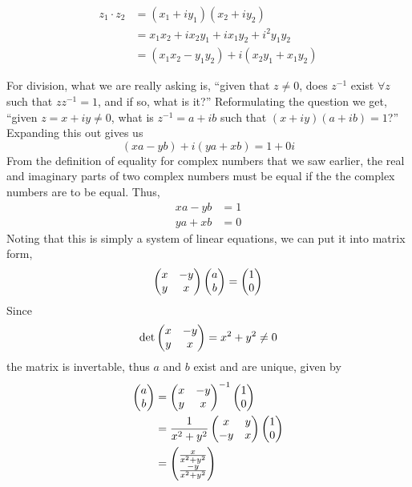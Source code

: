 \documentclass[10pt]{scrartcl}
\numberwithin{equation}{subsection}
\theoremstyle{definition}
\theoremstyle{remark}
\newcommand{\inv}[1]{
	{#1}^{-1}
}
\begin{document}
\begin{align*}
z_1 \cdot z_2 &= (x_1 + i y_1)(x_2+ i y_2)\\
&= x_1 x_2 + i x_2 y_1 + i x_1 y_2 + i^2 y_1 y_2\\
&= (x_1 x_2 - y_1 y_2) + i(x_2 y_1 + x_1 y_2)
\end{align*}

For division, what we are really asking is, 
``given that $z \neq 0$, does $\inv{z}$ exist $\forall z$ such that $z \inv{z} = 1$, and if so, what is it?'' 
Reformulating the question we get,
``given $z = x + iy \neq 0$, what is $\inv{z} = a + ib$ such that $(x+iy)(a+ib) = 1$?''
Expanding this out gives us
\[
(xa - yb) + i(ya + xb) = 1 + 0i
\]
From the definition of equality for complex numbers that we saw earlier,
the real and imaginary parts of two complex numbers must be equal if the the
complex numbers are to be equal. Thus,
\begin{align*}
xa - yb &= 1 \\
ya + xb &= 0
\end{align*}
Noting that this is simply a system of linear equations, we can put it into
matrix form,
\[
\pmqty{x & -y \\ y & x} \pmqty{a \\ b} = \pmqty{1 \\ 0}
\]
Since 
\[
\det \pmqty{x & -y \\ y & x}  = x^2 + y^2 \neq 0
\]
the matrix is invertable, thus $a$ and $b$ exist and are unique, given by
\begin{align*}
\pmqty{a \\ b} &= \inv{\pmqty{x & -y \\ y & x}} \pmqty{1 \\ 0} \\
&= \frac{1}{x^2 + y^2} \pmqty{x & y \\ -y & x } \pmqty{1 \\ 0} \\
&= \pmqty{\frac{x}{x^2+y^2} \\ \frac{-y}{x^2+y^2}} \\
\end{align*}
\end{document}
